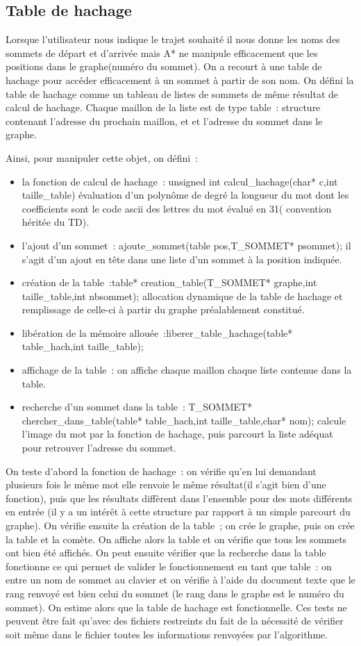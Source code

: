 \documentclass[12pt,a4paper]{article}
\begin{document}
\subsection{Table de hachage}
Lorsque l’utilisateur nous indique le trajet souhaité il nous donne les noms des sommets de départ et d’arrivée mais A* ne manipule efficacement que les positions dans le graphe(numéro du sommet). On a recourt à une table de hachage pour accéder efficacement à un sommet à partir de son nom.
On défini la table de hachage comme un tableau de listes de sommets de même résultat de calcul de hachage. Chaque maillon de la liste est de type table : structure contenant l’adresse du prochain maillon, et et l’adresse du sommet dans le graphe.

Ainsi, pour manipuler cette objet, on défini :
\begin{itemize}
        \item la fonction de calcul de hachage : unsigned int calcul\_hachage(char* c,int taille\_table)
évaluation d’un polynôme de degré la longueur du mot dont les coefficients sont le code ascii des lettres du mot évalué en 31( convention héritée du TD). 
\item l’ajout d’un sommet : ajoute\_sommet(table pos,T\_SOMMET* psommet); il s’agit d’un ajout en tête dans une liste d’un sommet à la position indiquée.
\item création de la table :table* creation\_table(T\_SOMMET* graphe,int taille\_table,int nbsommet); allocation dynamique de la table de hachage et remplissage de celle-ci à partir du graphe préalablement constitué. 
\item libération de la mémoire allouée :liberer\_table\_hachage(table* table\_hach,int taille\_table);
\item affichage de la table : on affiche chaque maillon chaque liste contenue dans la table.
\item recherche d’un sommet dans la table :
T\_SOMMET* chercher\_dans\_table(table* table\_hach,int taille\_table,char* nom); calcule l’image du mot par la fonction de hachage, puis parcourt la liste adéquat pour retrouver l’adresse du sommet.
\end{itemize}
On teste d’abord la fonction de hachage : on vérifie qu’en lui demandant plusieurs fois le même mot elle renvoie le même résultat(il s’agit bien d’une fonction), puis que les résultats diffèrent dans l’ensemble pour des mots différents en entrée (il y a un intérêt à cette structure par rapport à un simple parcourt du graphe).
On vérifie ensuite la création de la table ; on crée le graphe, puis on crée la table et la comète. On affiche alors la table et on vérifie que tous les sommets ont bien été affichés. On peut ensuite vérifier que la recherche dans la table fonctionne ce qui permet de valider le fonctionnement en tant que table : on entre un nom de sommet au clavier et on vérifie à l’aide du document texte que le rang renvoyé est bien celui du sommet (le rang dans le graphe est le numéro du sommet).
On estime alors que la table de hachage est fonctionnelle. Ces tests ne peuvent être fait qu’avec des fichiers restreints du fait de la nécessité de vérifier soit même dans le fichier toutes les informations renvoyées par l’algorithme.
\end{document}
